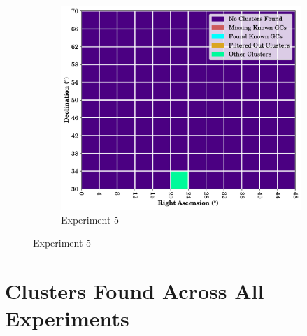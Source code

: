 \begin{figure}[H]
    \begin{subfigure}[b]{0.5\textwidth}
        \includegraphics[width=\textwidth]{./figures/rasters/grids/grid-run-05-a4.pdf}
        \caption{Experiment 5}
    \end{subfigure}
\end{figure}

\chapter{\label{ch:second-appendix}Clusters Found Across All Experiments}

